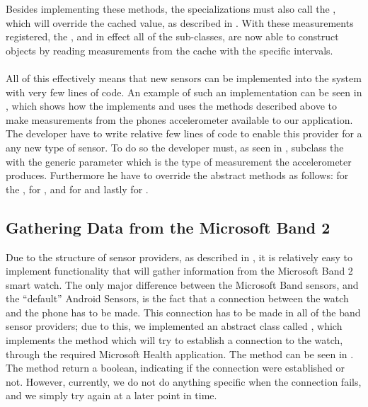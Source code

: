 Besides implementing these methods, the specializations must also call the , which will override the cached value, as described in . With these measurements registered, the , and in effect all of the sub-classes, are now able to construct  objects by reading measurements from the cache with the specific intervals. 
\\\\
All of this effectively means that new sensors can be implemented into the system with very few lines of code. An example of such an implementation can be seen in , which shows how the  implements and uses the methods described above to make measurements from the phones accelerometer available to our application. The developer have to write relative few lines of code to enable this provider for a any new type of sensor. To do so the developer must, as seen in , subclass the  with the generic parameter  which is the type of measurement the accelerometer produces. Furthermore he have to override the abstract methods as follows:  for the ,  for ,  and  for  and lastly  for .


\FloatBarrier

\subsection{Gathering Data from the Microsoft Band 2}
Due to the structure of sensor providers, as described in , it is relatively easy to implement functionality that will gather information from the Microsoft Band 2 smart watch. The only major difference between the Microsoft Band sensors, and the ``default'' Android Sensors, is the fact that a connection between the watch and the phone has to be made. This connection has to be made in all of the band sensor providers; due to this, we implemented an abstract class called , which implements the method  which will try to establish a connection to the watch, through the required Microsoft Health application. The method can be seen in . The method return a boolean, indicating if the connection were established or not. However, currently, we do not do anything specific when the connection fails, and we simply try again at a later point in time.  


\FloatBarrier

